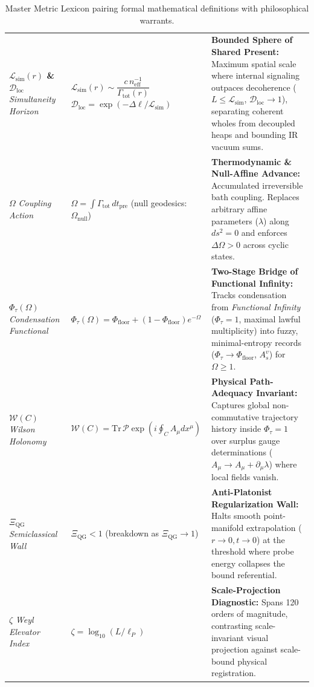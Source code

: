 \documentclass[11pt,a4paper]{article}
\begin{document}
\begin{table}[htbp]
\begin{tabularx}{\textwidth}{>{\raggedright\arraybackslash}p{2.9cm} >{\raggedright\arraybackslash}p{4.3cm} >{\raggedright\arraybackslash}X}
\textbf{$\mathcal{L}_{\mathrm{sim}}(r)$ \& $\mathcal{D}_{\mathrm{loc}}$} \newline \emph{Simultaneity Horizon} & $\mathcal{L}_{\mathrm{sim}}(r) \sim \dfrac{c \, n_{\mathrm{eff}}^{-1}}{\Gamma_{\mathrm{tot}}(r)}$ \newline $\mathcal{D}_{\mathrm{loc}} = \exp(-\Delta\ell / \mathcal{L}_{\mathrm{sim}})$ & \textbf{Bounded Sphere of Shared Present:} Maximum spatial scale where internal signaling outpaces decoherence ($L \le \mathcal{L}_{\mathrm{sim}}$, $\mathcal{D}_{\mathrm{loc}} \to 1$), separating coherent wholes from decoupled heaps and bounding IR vacuum sums. \\
\textbf{$\Omega$} \newline \emph{Coupling Action} & $\Omega = \int \Gamma_{\mathrm{tot}} \, dt_{\mathrm{pre}}$ \newline (null geodesics: $\Omega_{\mathrm{null}}$) & \textbf{Thermodynamic \& Null-Affine Advance:} Accumulated irreversible bath coupling. Replaces arbitrary affine parameters ($\lambda$) along $ds^2=0$ and enforces $\Delta\Omega > 0$ across cyclic states. \\
\textbf{$\Phi_\tau(\Omega)$} \newline \emph{Condensation Functional} & $\Phi_\tau(\Omega) = \Phi_{\mathrm{floor}} + (1 - \Phi_{\mathrm{floor}})e^{-\Omega}$ & \textbf{Two-Stage Bridge of Functional Infinity:} Tracks condensation from \emph{Functional Infinity} ($\Phi_\tau = 1$, maximal lawful multiplicity) into fuzzy, minimal-entropy records ($\Phi_\tau \to \Phi_{\mathrm{floor}}$, $A_s^v$) for $\Omega \ge 1$. \\
\textbf{$\mathcal{W}(C)$} \newline \emph{Wilson Holonomy} & $\mathcal{W}(C) = \mathrm{Tr}\,\mathcal{P}\exp\!\left(i \oint_C A_\mu dx^\mu\right)$ & \textbf{Physical Path-Adequacy Invariant:} Captures global non-commutative trajectory history inside $\Phi_\tau = 1$ over surplus gauge determinations ($A_\mu \to A_\mu + \partial_\mu\lambda$) where local fields vanish. \\
\textbf{$\Xi_{\mathrm{QG}}$} \newline \emph{Semiclassical Wall} & $\Xi_{\mathrm{QG}} < 1$ \newline (breakdown as $\Xi_{\mathrm{QG}} \to 1$) & \textbf{Anti-Platonist Regularization Wall:} Halts smooth point-manifold extrapolation ($r \to 0, t \to 0$) at the threshold where probe energy collapses the bound referential. \\
\textbf{$\zeta$} \newline \emph{Weyl Elevator Index} & $\zeta = \log_{10}(L / \ell_P)$ & \textbf{Scale-Projection Diagnostic:} Spans 120 orders of magnitude, contrasting scale-invariant visual projection against scale-bound physical registration. \\
\bottomrule
\end{tabularx}
\caption{Master Metric Lexicon pairing formal mathematical definitions with philosophical warrants.}
\label{tab:lexicon}
\end{table}
\end{document}
